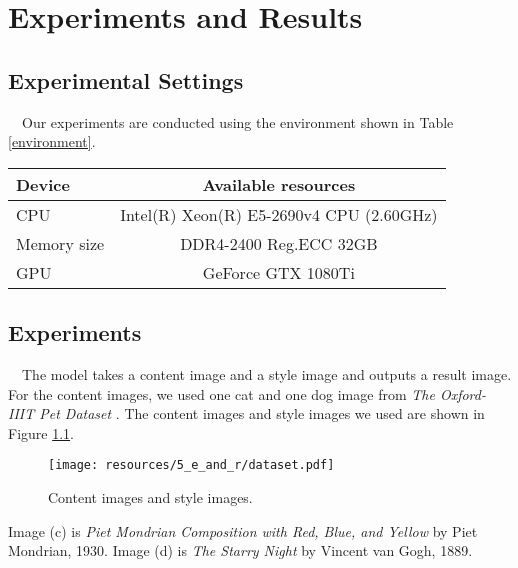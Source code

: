 \chapter{Experiments and Results}

\section{Experimental Settings}
　Our experiments are conducted using the environment shown in Table \ref{environment}.

\setlength{\tabcolsep}{6pt}
\begin{table*}[h]
\begin{center} 
\caption{Environment of experiments}
\label{environment}
{\normalsize
\begin{tabular}{l c}

\toprule
Device & Available resources \\
\midrule
CPU & Intel(R) Xeon(R) E5-2690v4 CPU (2.60GHz)\\
Memory size & DDR4-2400 Reg.ECC 32GB\\
GPU & GeForce GTX 1080Ti  \\
\bottomrule
\end{tabular}
} \end{center} \end{table*}
\setlength{\tabcolsep}{6pt}


\section{Experiments}
　The model takes a content image and a style image and outputs a result image.
For the content images, we used one cat and one dog image from \textit{The Oxford-IIIT Pet Dataset}
\cite{Oxford-data} .
The content images and style images we used are shown in Figure \ref{dataset}.
\begin{figure}[h]
    \centering
    \texttt{[image: resources/5\_e\_and\_r/dataset.pdf]}
    \caption{
        Content images and style images.
    }
    \label{dataset}
\end{figure}
Image (c) is \textit{Piet Mondrian Composition with Red, Blue, and Yellow}
by Piet Mondrian, 1930.
Image (d) is \textit{The Starry Night} by Vincent van Gogh, 1889. 

\vspace{3cm}
